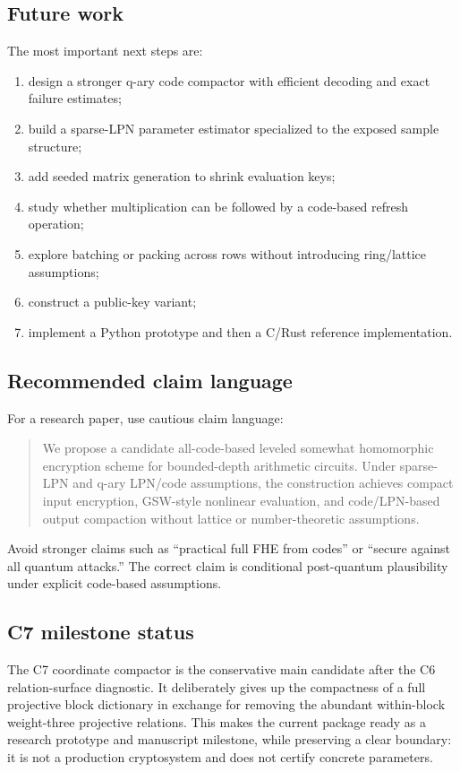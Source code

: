 \subsection{Future work}

The most important next steps are:
\begin{enumerate}
    \item design a stronger q-ary code compactor with efficient decoding and exact failure estimates;
    \item build a sparse-LPN parameter estimator specialized to the exposed sample structure;
    \item add seeded matrix generation to shrink evaluation keys;
    \item study whether multiplication can be followed by a code-based refresh operation;
    \item explore batching or packing across rows without introducing ring/lattice assumptions;
    \item construct a public-key variant;
    \item implement a Python prototype and then a C/Rust reference implementation.
\end{enumerate}

\subsection{Recommended claim language}

For a research paper, use cautious claim language:

\begin{quote}
We propose a candidate all-code-based leveled somewhat homomorphic encryption scheme for bounded-depth arithmetic circuits.  Under sparse-LPN and q-ary LPN/code assumptions, the construction achieves compact input encryption, GSW-style nonlinear evaluation, and code/LPN-based output compaction without lattice or number-theoretic assumptions.
\end{quote}

Avoid stronger claims such as ``practical full FHE from codes'' or ``secure against all quantum attacks.''  The correct claim is conditional post-quantum plausibility under explicit code-based assumptions.


\subsection{C7 milestone status}

The C7 coordinate compactor is the conservative main candidate after the C6
relation-surface diagnostic.  It deliberately gives up the compactness of a full
projective block dictionary in exchange for removing the abundant within-block
weight-three projective relations.  This makes the current package ready as a
research prototype and manuscript milestone, while preserving a clear boundary:
it is not a production cryptosystem and does not certify concrete parameters.


